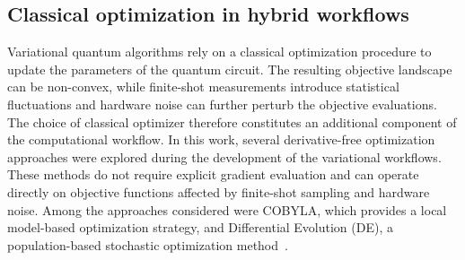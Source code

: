\subsection{Classical optimization in hybrid workflows}
Variational quantum algorithms rely on a classical optimization procedure to update the parameters of the quantum circuit. The resulting objective landscape can be non-convex, while finite-shot measurements introduce statistical fluctuations and hardware noise can further perturb the objective evaluations. The choice of classical optimizer therefore constitutes an additional component of the computational workflow.
In this work, several derivative-free optimization approaches were explored during the development of the variational workflows. These methods do not require explicit gradient evaluation and can operate directly on objective functions affected by finite-shot sampling and hardware noise. Among the approaches considered were COBYLA, which provides a local model-based optimization strategy, and Differential Evolution (DE), a population-based stochastic optimization method~\cite{Failde2023,Kandala2017,DE,DE_2}.



